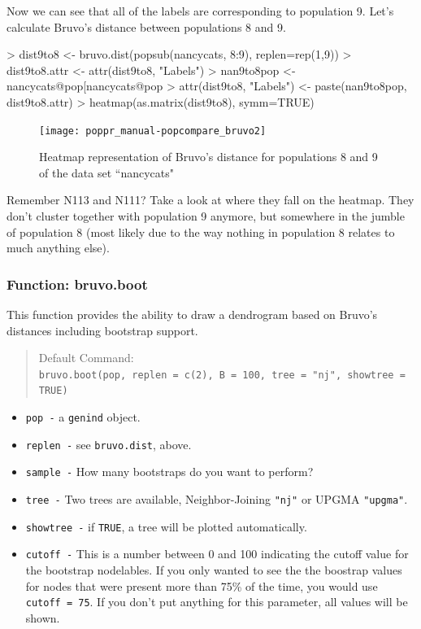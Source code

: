 \documentclass[letterpaper]{article}
\newcommand{\tab}{\hspace*{1em}}
\begin{document}
Now we can see that all of the labels are corresponding to population 9. Let's calculate Bruvo's distance between populations 8 and 9.
\begin{Schunk}
\begin{Sinput}
> dist9to8 <- bruvo.dist(popsub(nancycats, 8:9), replen=rep(1,9))
> dist9to8.attr <- attr(dist9to8, "Labels")
> nan9to8pop <- nancycats@pop[nancycats@pop %
> attr(dist9to8, "Labels") <- paste(nan9to8pop, dist9to8.attr)
> heatmap(as.matrix(dist9to8), symm=TRUE)
\end{Sinput}
\end{Schunk}
\begin{figure}[h!]
  \centering
  \caption{Heatmap representation of Bruvo's distance for populations 8 and 9 of the data set ``nancycats"}
  \label{bruvo_heat_map_8to9}
\texttt{[image: poppr\_manual-popcompare\_bruvo2]}
\end{figure}

Remember N113 and N111? Take a look at where they fall on the heatmap. They don't cluster together with population 9 anymore, but somewhere in the jumble of population 8 (most likely due to the way nothing in population 8 relates to much anything else).
\subsubsection{Function: bruvo.boot}

\tab\tab This function provides the ability to draw a dendrogram based on Bruvo's distances including bootstrap support. 
\begin{quote}
Default Command:\\
\texttt{bruvo.boot(pop, replen = c(2), B = 100, tree = "nj", showtree = TRUE)}
\end{quote}
\begin{itemize}
  \item \texttt{pop -} a \texttt{genind} object.
  \item \texttt{replen -} see \texttt{bruvo.dist}, above.
  \item \texttt{sample -} How many bootstraps do you want to perform? 
  \item \texttt{tree -} Two trees are available, Neighbor-Joining \texttt{"nj"} or UPGMA \texttt{"upgma"}.
  \item \texttt{showtree -} if \texttt{TRUE}, a tree will be plotted automatically.
  \item \texttt{cutoff -} This is a number between 0 and 100 indicating the cutoff value for the bootstrap nodelables. If you only wanted to see the the boostrap values for nodes that were present more than 75\% of the time, you would use \texttt{cutoff = 75}. If you don't put anything for this parameter, all values will be shown.
\end{itemize}
\end{document}
